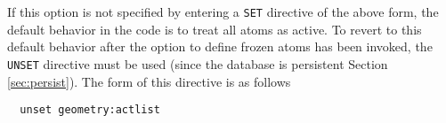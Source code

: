 If this option is not specified by entering a \verb+SET+ directive 
of the above form, the default behavior in the code is to treat
all atoms as active.  To revert to this default behavior after the
option to define frozen atoms has been invoked, the \verb+UNSET+
directive must be used
(since
the database is persistent Section \ref{sec:persist}).  The form of
this directive is as follows
\begin{verbatim}
  unset geometry:actlist
\end{verbatim}





